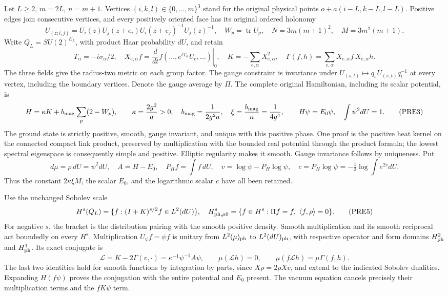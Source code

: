 \documentclass[11pt]{article}
\begin{document}
Let \(L\ge2\), \(m=2L\), \(n=m+1\). Vertices \((i,k,l)\in\{0,\ldots,m\}^3\) stand for the original physical points \(o+a(i-L,k-L,l-L)\). Positive edges join consecutive vertices, and every positively oriented face has its original ordered holonomy
\[
 U_{(z;i,j)}=U_i(z)U_j(z+e_i)U_i(z+e_j)^{-1}U_j(z)^{-1},
 \quad W_p=\operatorname{tr}U_p,\quad
 N=3m(m+1)^2,\quad M=3m^2(m+1).
 \tag{PRE1}
\]
Write \(Q_L=SU(2)^{E_L}\), with product Haar probability \(dU\), and retain
\[
 T_\alpha=-i\sigma_\alpha/2,\quad
 X_{e,\alpha}f=\left.\frac d{dt}f(\ldots,e^{tT_\alpha}U_e,\ldots)\right|_0,
 \quad K=-\sum_{e,\alpha}X_{e,\alpha}^2,\quad
 \Gamma(f,h)=\sum_{e,\alpha}X_{e,\alpha}f\,X_{e,\alpha}h.
 \tag{PRE2}
\]
The three fields give the radius-two metric on each group factor. The gauge constraint is invariance under \(U_{(s,t)}\mapsto q_sU_{(s,t)}q_t^{-1}\) at every vertex, including the boundary vertices. Denote the gauge average by \(\Pi\). The complete original Hamiltonian, including its scalar potential, is
\[
 H=\kappa K+b_{\rm mag}\sum_p(2-W_p),\qquad
 \kappa=\frac{2g^2}{a}>0,\quad b_{\rm mag}=\frac1{2g^2a},\quad
 \xi=\frac{b_{\rm mag}}{\kappa}=\frac1{4g^4},\qquad
 H\psi=E_0\psi,\quad \int\psi^2dU=1.
 \tag{PRE3}
\]
The ground state is strictly positive, smooth, gauge invariant, and unique with this positive phase. One proof is the positive heat kernel on the connected compact link product, preserved by multiplication with the bounded real potential through the product formula; the lowest spectral eigenspace is consequently simple and positive. Elliptic regularity makes it smooth. Gauge invariance follows by uniqueness. Put
\[
 d\mu=\rho\,dU=\psi^2dU,\quad A=H-E_0,\quad
 P_Hf=\int f\,dU,\quad v=\log\psi-P_H\log\psi,\quad
 c=P_H\log\psi=-\tfrac12\log\int e^{2v}dU.
 \tag{PRE4}
\]
Thus the constant \(2\kappa\xi M\), the scalar \(E_0\), and the logarithmic scalar \(c\) have all been retained.

Use the unchanged Sobolev scale
\[
 H^s(Q_L)=\{f:(I+K)^{s/2}f\in L^2(dU)\},\quad
 H^s_{{\rm ph},\mu0}=\{f\in H^s:\Pi f=f,\ \langle f,\rho\rangle=0\}.
 \tag{PRE5}
\]
For negative \(s\), the bracket is the distribution pairing with the smooth positive density. Smooth multiplication and its smooth reciprocal act boundedly on every \(H^s\). Multiplication \(U_\psi f=\psi f\) is unitary from \(L^2(\mu)_{\rm ph}\) to \(L^2(dU)_{\rm ph}\), with respective operator and form domains \(H^2_{\rm ph}\) and \(H^1_{\rm ph}\). Its exact conjugate is
\[
 \mathcal L=K-2\Gamma(v,\cdot)
   =\kappa^{-1}\psi^{-1}A\psi,\qquad
 \mu(\mathcal Lh)=0,\qquad
 \mu(f\mathcal Lh)=\mu\Gamma(f,h).
 \tag{PRE6}
\]
The last two identities hold for smooth functions by integration by parts, since \(X\rho=2\rho Xv\), and extend to the indicated Sobolev dualities. Expanding \(H(f\psi)\) proves the conjugation with the entire potential and \(E_0\) present. The vacuum equation cancels precisely their multiplication terms and the \(fK\psi\) term.
\end{document}
